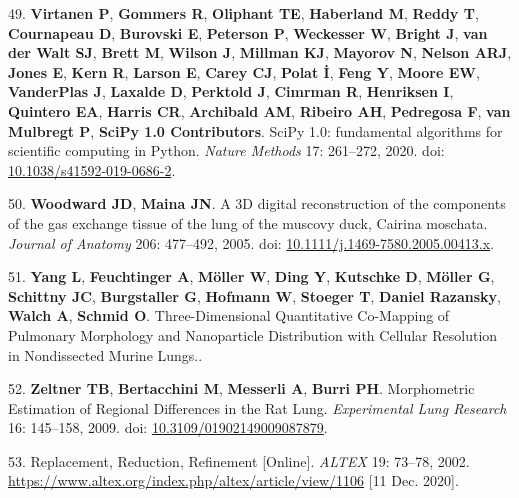 \documentclass[
  american,
]{article}
\newenvironment{cslreferences}%
  {}%
  {\par}
\begin{document}
\begin{cslreferences}
\leavevmode\hypertarget{ref-8Miti2Gz}{}%
49. \textbf{Virtanen P}, \textbf{Gommers R}, \textbf{Oliphant TE}, \textbf{Haberland M}, \textbf{Reddy T}, \textbf{Cournapeau D}, \textbf{Burovski E}, \textbf{Peterson P}, \textbf{Weckesser W}, \textbf{Bright J}, \textbf{van der Walt SJ}, \textbf{Brett M}, \textbf{Wilson J}, \textbf{Millman KJ}, \textbf{Mayorov N}, \textbf{Nelson ARJ}, \textbf{Jones E}, \textbf{Kern R}, \textbf{Larson E}, \textbf{Carey CJ}, \textbf{Polat İ}, \textbf{Feng Y}, \textbf{Moore EW}, \textbf{VanderPlas J}, \textbf{Laxalde D}, \textbf{Perktold J}, \textbf{Cimrman R}, \textbf{Henriksen I}, \textbf{Quintero EA}, \textbf{Harris CR}, \textbf{Archibald AM}, \textbf{Ribeiro AH}, \textbf{Pedregosa F}, \textbf{van Mulbregt P}, \textbf{SciPy 1.0 Contributors}. SciPy 1.0: fundamental algorithms for scientific computing in Python. \emph{Nature Methods} 17: 261--272, 2020. doi: \href{https://doi.org/10.1038/s41592-019-0686-2}{10.1038/s41592-019-0686-2}.

\leavevmode\hypertarget{ref-CPhMy3Ie}{}%
50. \textbf{Woodward JD}, \textbf{Maina JN}. A 3D digital reconstruction of the components of the gas exchange tissue of the lung of the muscovy duck, Cairina moschata. \emph{Journal of Anatomy} 206: 477--492, 2005. doi: \href{https://doi.org/10.1111/j.1469-7580.2005.00413.x}{10.1111/j.1469-7580.2005.00413.x}.

\leavevmode\hypertarget{ref-19jBv0ima}{}%
51. \textbf{Yang L}, \textbf{Feuchtinger A}, \textbf{Möller W}, \textbf{Ding Y}, \textbf{Kutschke D}, \textbf{Möller G}, \textbf{Schittny JC}, \textbf{Burgstaller G}, \textbf{Hofmann W}, \textbf{Stoeger T}, \textbf{Daniel Razansky}, \textbf{Walch A}, \textbf{Schmid O}. Three-Dimensional Quantitative Co-Mapping of Pulmonary Morphology and Nanoparticle Distribution with Cellular Resolution in Nondissected Murine Lungs..

\leavevmode\hypertarget{ref-I9TmP6IU}{}%
52. \textbf{Zeltner TB}, \textbf{Bertacchini M}, \textbf{Messerli A}, \textbf{Burri PH}. Morphometric Estimation of Regional Differences in the Rat Lung. \emph{Experimental Lung Research} 16: 145--158, 2009. doi: \href{https://doi.org/10.3109/01902149009087879}{10.3109/01902149009087879}.

\leavevmode\hypertarget{ref-199ALtdJt}{}%
53. Replacement, Reduction, Refinement {[}Online{]}. \emph{ALTEX} 19: 73--78, 2002. \url{https://www.altex.org/index.php/altex/article/view/1106} {[}11 Dec. 2020{]}.
\end{cslreferences}
\end{document}
